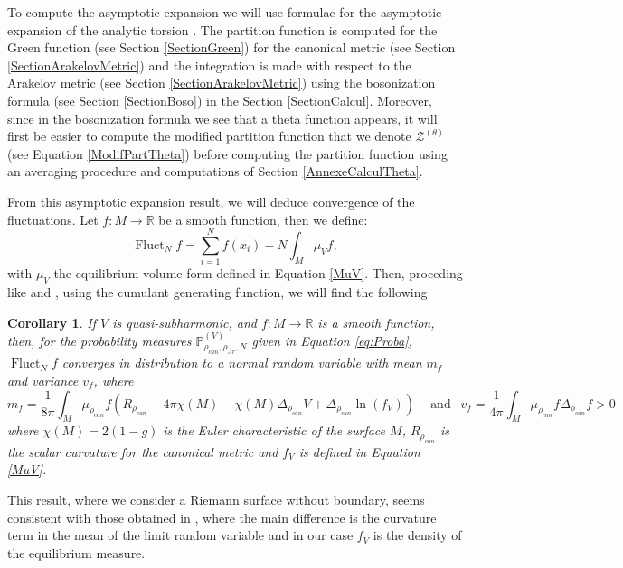 \documentclass{article}
\newtheorem{Corollary}[theorem]{Corollary}
\theoremstyle{definition}
\theoremstyle{remark}
\DeclareMathOperator{\Fluct}{Fluct}
\begin{document}
 To compute the asymptotic expansion we will use formulae for the asymptotic expansion of the analytic torsion \cite{FINSKI20183457,BismutVasserotAsymptoticAT}. 
The partition function is computed for the Green function (see Section \ref{SectionGreen}) for the canonical metric (see Section \ref{SectionArakelovMetric}) and the integration is made with respect to the Arakelov metric (see Section \ref{SectionArakelovMetric}) using the bosonization formula (see Section \ref{SectionBoso}) in the Section \ref{SectionCalcul}. Moreover, since in the bosonization formula we see that a theta function appears, it will first be easier to compute the modified partition function that we denote $\mathcal{Z}^{(\theta)}$ (see Equation \eqref{ModifPartTheta}) before computing the partition function using an averaging procedure and computations of Section \ref{AnnexeCalculTheta}.

From this asymptotic expansion result, we will deduce convergence of the fluctuations. Let $f: M \to \mathbb{R}$ be a smooth function, then we define: $$\Fluct_{N}f= \sum_{i=1}^{N}f(x_{i})-N\int_{M} \mu_{V} f, $$ with $\mu_{V}$ the equilibrium volume form defined in Equation \eqref{MuV}. Then, proceding like \cite[Section 1.3.1]{ameur2025freeenergyfluctuationsrandom} and \cite[Section 1.3.2]{ameur2025twodimensionalcoulombgasfluctuations}, using the cumulant generating function, we will find the following 

\begin{Corollary}\label{FluctuationsConvergence}
	If $V$ is quasi-subharmonic, and $f : M \to \mathbb{R}$ is a smooth function, then, for the probability measures $\mathbb{P}^{(V)}_{\rho_{can},\rho_{Ar},N}$ given in Equation \eqref{eq:Proba},  $\Fluct_{N}f$ converges in distribution to a normal random variable with mean $m_{f}$ and variance $v_{f}$, where   $$ m_{f} =\frac{1}{8\pi}\int_{M} \mu_{\rho_{can}}f \left(R_{\rho_{can}}-4\pi\chi(M)-\chi(M)\Delta_{\rho_{can}}V+\Delta_{\rho_{can}} \ln (f_{V}) \right)  ~~~~\text{ and } ~~v_{f}=\frac{1}{4\pi}\int_{M}\mu_{\rho_{can}} f\Delta_{\rho_{can}} f >0 $$
	where $\chi(M)=2(1-g)$ is the Euler characteristic of the surface $M$, $R_{\rho_{can}}$ is the scalar curvature for the canonical metric and $f_{V}$ is defined in Equation \eqref{MuV}.
\end{Corollary}
This result, where we consider a Riemann surface without boundary, seems consistent with those obtained in \cite[Theorem 1]{LebléSerfatyFluctuationsCoulombGases}, \cite[Theorem 1.4]{ameur2025twodimensionalcoulombgasfluctuations} where the main difference is the curvature term in the mean of the limit random variable and in our case $f_{V}$ is the density of the equilibrium measure.
\end{document}
